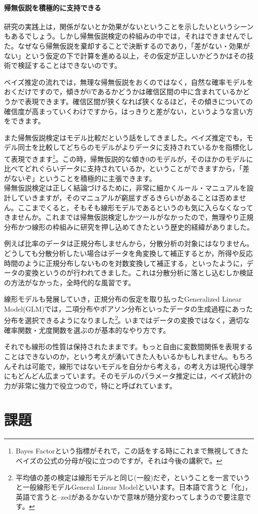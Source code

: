 \documentclass{ltjsarticle}
\begin{document}
\paragraph{帰無仮説を積極的に支持できる}
研究の実践上は，関係がないとか効果がないということを示したいというシーンもあるでしょう。しかし帰無仮説検定の枠組みの中では，それはできませんでした。なぜなら帰無仮説を棄却することで決断するのであり，「差がない・効果がない」という仮定の下で計算を進める以上，その仮定が正しいかどうかはその技術で検証することはできないのです。

ベイズ推定の流れでは，無理な帰無仮説をおくのではなく，自然な確率モデルをおくだけですので，傾きが0であるかどうかは確信区間の中に含まれているかどうかで表現できます。確信区間が狭くなれば狭くなるほど，その傾きについての確信度が高まっていくわけですから，はっきりと差がない，というような言い方をできます。

また帰無仮説検定はモデル比較だという話をしてきました。ベイズ推定でも，モデル同士を比較してどちらのモデルがよりデータに支持されているかを指標化して表現できます\footnote{Bayes Factorという指標がそれで，この話をする時にこれまで無視してきたベイズの公式の分母が役に立つのですが，それは今後の講釈で。}。この時，帰無仮説的な傾き0のモデルが，そのほかのモデルに比べてどれぐらいデータに支持されているか，ということができますから，「差がないぞ」ということを積極的に主張できます。\\

帰無仮説検定は正しく結論づけるために，非常に細かくルール・マニュアルを設計していきますが，そのマニュアルが窮屈すぎるきらいがあることは否めません。ここまでくると，そもそも線形モデルであるというのも気に入らなくなってきませんか。これまでは帰無仮説検定しかツールがなかったので，無理やり正規分布かつ線形の枠組みに研究を押し込めてきたという歴史的経緯がありました。

例えば比率のデータは正規分布しませんから，分散分析の対象にはなりません。どうしても分散分析したい場合はデータを角変換して補正するとか，所得や反応時間のように正規分布しないものを対数変換して補正する，といったように，データの変換というのが行われてきました。これは分散分析に落とし込むしか検証の方法がなかった，全時代的な風習です。

線形モデルも発展していき，正規分布の仮定を取り払ったGeneralized Linear Model(GLM)では，二項分布やポアソン分布といったデータの生成過程にあった分布を選択できるようになりました\footnote{平均値の差の検定は線形モデルと同じ(一般)だぞ，ということを一言でいうと一般線形モデルGeneral Linear Modelといいます。日本語で言うと「化」，英語で言うと--zedがあるかないかで意味が随分変わってしまうので要注意です。}。いまではデータの変換ではなく，適切な確率関数・尤度関数を選ぶのが基本的なやり方です。

それでも線形の性質は保持されたままです。もっと自由に変数間関係を表現することはできないのか，という考えが湧いてきた人もいるかもしれません。もちろんそれは可能で，線形ではないモデルを自分から考える，の考え方は現代心理学にもどんどん広まっています。そのモデルのパラメータ推定には，ベイズ統計の力が非常に強力で役立つので，特にと呼ばれています。

\section{課題}
\end{document}
